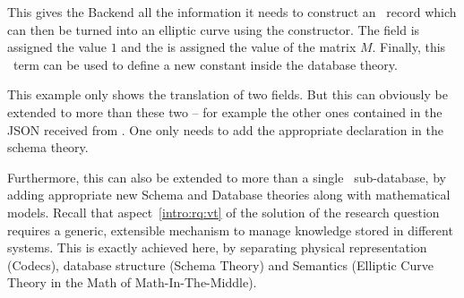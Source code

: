This gives the Backend all the information it needs to construct an \mmt\ record which can then be turned into an elliptic curve using the  constructor. 
The  field is assigned the value $1$ and the  is assigned the value of the matrix $M$. 
Finally, this \mmt\ term can be used to define a new constant inside the database theory. 

This example only shows the translation of two fields. 
But this can obviously be extended to more than these two -- for example the other ones contained in the JSON received from \lmfdb. 
One only needs to add the appropriate declaration in the schema theory. 

Furthermore, this can also be extended to more than a single \lmfdb\ sub-database, by adding appropriate new Schema and Database theories along with mathematical models. 
Recall that aspect~\ref{intro:rq:vt} of the solution of the research question requires a generic, extensible mechanism to manage knowledge stored in different systems. 
This is exactly achieved here, by separating physical representation (Codecs), database structure (Schema Theory) and Semantics (Elliptic Curve Theory in the Math of Math-In-The-Middle). 